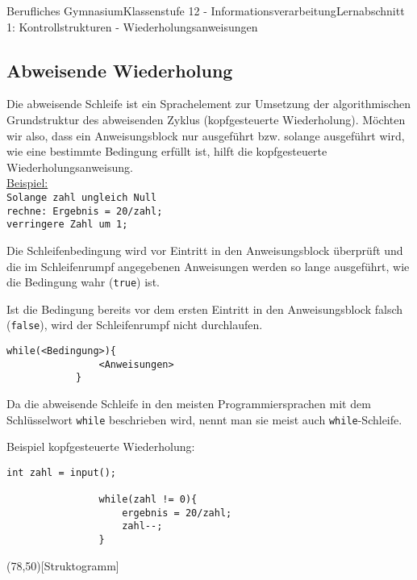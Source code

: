 \documentclass[11pt,oneside,openany,headings=optiontotoc,11pt,numbers=noenddot]{article}
\begin{document}
\begin{worksheet}{Berufliches Gymnasium}{Klassenstufe 12 - Informationsverarbeitung}{Lernabschnitt 1: Kontrollstrukturen - Wiederholungsanweisungen}
		\subsection{Abweisende Wiederholung}
		\label{abwei}
		Die abweisende Schleife ist ein Sprachelement zur Umsetzung der algorithmischen Grundstruktur des abweisenden Zyklus (kopfgesteuerte Wiederholung). Möchten wir also, dass ein Anweisungsblock nur ausgeführt bzw. solange ausgeführt wird, wie eine bestimmte Bedingung erfüllt ist, hilft die kopfgesteuerte Wiederholungsanweisung.\\
		\underline{Beispiel:}\\
		\texttt{\indent{}Solange zahl ungleich Null\\
		\indent{}\indent{}rechne: Ergebnis = 20/zahl;\\
		\indent{}\indent{}verringere Zahl um 1;}\\
		\par\noindent
		Die Schleifenbedingung wird vor Eintritt in den Anweisungsblock überprüft und die im Schleifenrumpf angegebenen Anweisungen werden so lange ausgeführt, wie die Bedingung wahr (\lstinline[style=JavaInputStyle]{true}) ist.\\
		\par\noindent
		Ist die Bedingung bereits vor dem ersten Eintritt in den Anweisungsblock falsch (\lstinline[style=JavaInputStyle]{false}), wird der Schleifenrumpf nicht durchlaufen.\\
		\begin{lstlisting}[style=JavaInputStyle]
			while(<Bedingung>){
				<Anweisungen>
			}
		\end{lstlisting}
		\par\bigskip\noindent
		Da die abweisende Schleife in den meisten Programmiersprachen mit dem Schlüsselwort \lstinline[style=JavaInputStyle]{while} beschrieben wird, nennt man sie meist auch \lstinline[style=JavaInputStyle]{while}-Schleife.\\
		\par\noindent
		\begin{minipage}[t]{0.48\textwidth}
			\vspace*{0pt}
			Beispiel kopfgesteuerte Wiederholung:
			\begin{lstlisting}[style=JavaInputStyle,frame=single]
				int zahl = input();
				
				while(zahl != 0){
					ergebnis = 20/zahl;
					zahl--;
				}
			\end{lstlisting}
		\end{minipage}
		\hfill
		\begin{minipage}[t]{0.48\textwidth}
			\vspace*{0pt}
			\begin{struktogramm}(78,50)[Struktogramm]
				\whileend
			\end{struktogramm}
		\end{minipage}

\end{worksheet}
\end{document}
